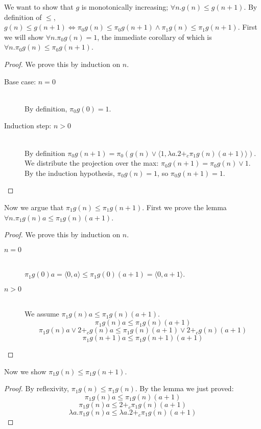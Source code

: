\documentclass[12pt,letterpaper]{article}
\begin{document}
We want to show that $g$ is monotonically increasing; $\forall n.g(n) \leq g(n+1)$.
By definition of $\leq$, $g(n) \leq g(n+1) \Leftrightarrow \pi_0 g(n) \leq \pi_0 g(n+1) \land \pi_1 g(n) \leq \pi_1 g(n+1)$.
First we will show $\forall n. \pi_0 g(n) = 1$, the immediate corollary of which is $\forall n. \pi_0 g(n) \leq \pi_0 g(n+1)$.
\begin{proof}
We prove this by induction on $n$.
  \begin{description}
    \item[Base case: $n=0$]\hfill \\
      By definition, $\pi_0 g(0) = 1$.
    \item[Induction step: $n>0$]\hfill \\
      By definition $\pi_0 g(n+1) = \pi_0 (g(n) \vee \langle 1, \lambda a. 2 +_c \pi_1g(n) (a+1)\rangle)$.
      We distribute the projection over the max: $\pi_0 g(n+1) = \pi_0 g(n) \vee 1$.
      By the induction hypothesis, $\pi_0 g(n) = 1$, so $\pi_0 g(n+1) = 1$.
  \end{description}
\end{proof}
Now we argue that $\pi_1g(n) \leq \pi_1 g(n+1)$.
First we prove the lemma $\forall n.\pi_1 g(n) a \leq \pi_1 g(n) (a+1)$.
\begin{proof}
  We prove this by induction on $n$.
  \begin{description}
    \item[$n=0$]\hfill \\
      $\pi_1 g(0) a = \langle 0,a\rangle \leq \pi_1 g(0) (a+1) = \langle 0,a+1 \rangle$.
    \item[$n>0$]\hfill \\
      We assume $\pi_1 g(n) a \leq \pi_1 g(n) (a+1)$.
      \[ \pi_1 g(n) a \leq \pi_1 g(n) (a+1) \]
      \[ \pi_1 g(n) a \vee 2 +_c g(n) a \leq \pi_1 g(n) (a+1) \vee 2 +_c g(n) (a+1) \]
      \[ \pi_1 g(n+1) a \leq \pi_1 g(n+1) (a+1) \]
  \end{description}
\end{proof}

Now we show $\pi_1 g(n) \leq \pi_1 g(n+1)$.
\begin{proof}
  By reflexivity, $\pi_1 g(n) \leq \pi_1 g(n)$.
  By the lemma we just proved:
  \[ \pi_1 g(n) a \leq \pi_1 g(n) (a+1) \]
  \[ \pi_1 g(n) a \leq 2 +_c \pi_1 g(n) (a+1) \]
  \[ \lambda a.\pi_1 g(n) a \leq \lambda a. 2 +_c \pi_1 g(n) (a+1) \]
\end{proof}
\end{document}
